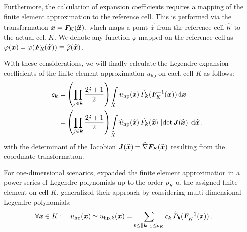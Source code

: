 Furthermore, the calculation of expansion coefficients requires a mapping of the finite element approximation to the reference cell. This is performed via the transformation $\vec{x} = \mat{F}_K(\vec{\widehat{x}})$, which maps a point $\vec{\widehat{x}}$ from the reference cell $\widehat{K}$ to the actual cell $K$. We denote any function $\varphi$ mapped on the reference cell as $\varphi(\vec{x}) = \varphi(\mat{F}_K(\vec{\widehat{x}})) \equiv \widehat{\varphi}(\vec{\widehat{x}})$. \textcite{dealiimapping}

With these considerations, we will finally calculate the Legendre expansion coefficients of the finite element approximation $u_\text{hp}$ on each cell $K$ as follows:
\begin{align}
c_\tuple{k} &=
\left(\prod\limits_{j \in \tuple{k}} \frac{2j+1}{2}\right) \int\limits_{K} u_\text{hp}(\vec{x}) \, \widetilde{P}_\tuple{k}(\mat{F}_K^{-1}(\vec{x})) \differential{\vec{x}} \\
&= \left(\prod\limits_{j \in \tuple{k}} \frac{2j+1}{2}\right) \int\limits_{\widehat{K}} \widehat{u}_\text{hp}(\vec{\widehat{x}}) \, \widetilde{P}_\tuple{k}(\vec{\widehat{x}}) \, \left|\det \mat{J}(\vec{\widehat{x}})\right| \differential{\vec{\widehat{x}}} \,\text{,}
\end{align}
with the determinant of the Jacobian $\mat{J}(\vec{\widehat{x}}) = \widehat{\nabla} \mat{F}_K (\vec{\widehat{x}})$ resulting from the coordinate transformation. \textcite{dealiilegendre}

For one-dimensional scenarios, \textcite{mavriplis1994} expanded the finite element approximation in a power series of Legendre polynomials up to the order $p_K$ of the assigned finite element on cell $K$. \textcites{houston2005}{eibner2007} generalized their approach by considering multi-dimensional Legendre polynomials:
\begin{align}
\forall \vec{x} \in K : \quad u_\text{hp} (\vec{x}) \simeq u_{\text{hp},\tuple{k}} (\vec{x}) &= \sum\limits_{0 \leq \|\tuple{k}\|_1 \leq p_K} c_\tuple{k} \, \widetilde{P}_\tuple{k}(\mat{F}_K^{-1}(\vec{x})) \,\text{.}
\end{align}

